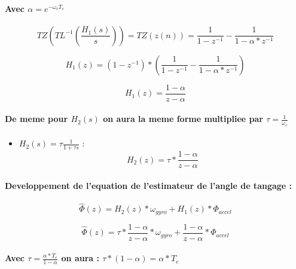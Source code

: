 \paragraph{Avec $\alpha = e^{-\omega_c T_e}$}

\begin{equation}
	TZ(TL^{-1}(\frac{H_1(s)}{s})) = TZ(z(n)) = \frac{1}{1 - z^{-1}} - \frac{1}{1 - \alpha * z^{-1}}
\end{equation}

\begin{equation}
	H_1(z) = (1 - z^{-1}) * (\frac{1}{1 - z^{-1}} - \frac{1}{1 - \alpha * z^{-1}})
\end{equation}

\begin{equation}
	H_1(z) = \frac{1 - \alpha}{z - \alpha}
\end{equation}

\paragraph{De meme pour $H_2(s)$ on aura la meme forme multipliee par $\tau = \frac{1}{\omega_c}$}

\begin{itemize}
	\item $H_2(s) = \tau \frac{1}{1 + \tau s}$ : \begin{equation}
		H_2(z) = \tau * \frac{1 - \alpha}{z - \alpha}
	\end{equation}
\end{itemize}

\paragraph{Developpement de l'equation de l'estimateur de l'angle de tangage :}

\begin{equation}
	\hat{\Phi}(z) = H_2(z) * \omega_{gyro} + H_1(z) * \Phi_{accel}
\end{equation}

\begin{equation}
	\hat{\Phi}(z) = \tau * \frac{1 - \alpha}{z - \alpha} * \omega_{gyro} + \frac{1 - \alpha}{z - \alpha} * \Phi_{accel}
\end{equation}

\paragraph{Avec $\tau = \frac{\alpha * T_e}{1 - \alpha}$ on aura : $\tau * (1 - \alpha) = \alpha * T_e$}


